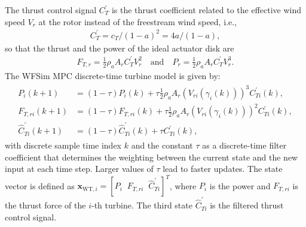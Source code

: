 The thrust control signal $C_T^{\prime}$ is the thrust coefficient related to the effective wind speed $V_r$ at the rotor instead of the freestream wind speed, i.e., 
\begin{align*}
    C_T^{\prime} = c_T/(1-a)^2 = 4a/(1-a),
\end{align*}
so that the thrust and the power of the ideal actuator disk are
\begin{align*}
    F_{T,r} = \frac{1}{2}\rho_a A_r C_T^{\prime} V_r^2 \quad \text{and} \quad P_r = \frac{1}{2}\rho_a A_r C_T^{\prime} V_r^3.
\end{align*}
The WFSim MPC discrete-time turbine model is given by:
\begin{align} \label{eqPowerWT}
    \begin{split}
        P_{i}(k+1) &= (1 - \tau) P_{i}(k) + \tau \frac{1}{2} \rho_a A_r \left(V_{ri}(\gamma_{i}(k))\right)^3 C_{Ti}^\prime(k), \\
        F_{T,ri}(k+1) &= (1 - \tau) F_{T,ri}(k) + \tau \frac{1}{2} \rho_a A_r \left(V_{ri}(\gamma_{i}(k))\right)^2 C_{Ti}^\prime(k), \\
        \hat{C}_{Ti}^\prime(k+1) &= (1 - \tau) \hat{C}_{Ti}^\prime(k) + \tau C_{Ti}^\prime(k),
    \end{split}
\end{align}
with discrete sample time index $k$ and the constant $\tau$ as a discrete-time filter coefficient that determines the weighting between the current state and the new input at each time step. Larger values of  $\tau$ lead to faster updates. The state vector is defined as $\bm{x}_{\text{WT},i} = [P_i \;\; F_{T,ri} \;\; \hat{C}_{Ti}^\prime]^T$, where $P_i$ is the power and $F_{T,ri}$ is the thrust force of the $i$-th turbine. The third state $\hat{C}_{Ti}^\prime$ is the filtered thrust control signal.

